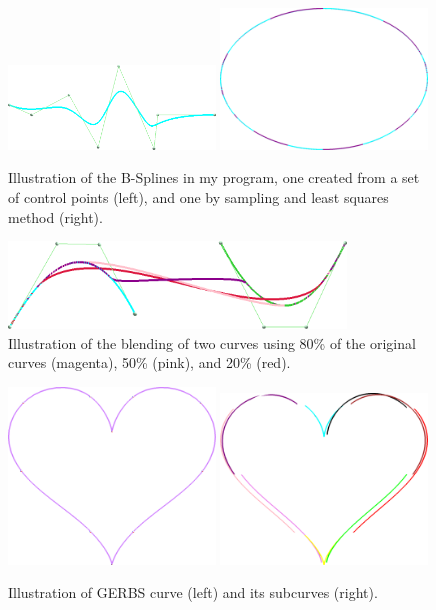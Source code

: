 \documentclass[a4paper,12pt]{extarticle}
\begin{document}
\begin{figure}[H]
  \centering
  \includegraphics[width=0.49\textwidth]{B-Spline.png}
  \includegraphics[width=0.49\textwidth]{Sampling.png}
  \caption{Illustration of the B-Splines in my program, one created from a set of control points (left), and one by sampling and least squares method (right).}
  \label{fig:B-Splines}
\end{figure}

\begin{figure}[H]
  \centering
  \includegraphics[width=0.8\textwidth]{Blending.png}
  \caption{Illustration of the blending of two curves using 80\% of the original curves (magenta), 50\% (pink), and 20\% (red).}
  \label{fig:Blending}
\end{figure}

\begin{figure}[H]
  \centering
  \includegraphics[width=0.49\textwidth]{GERBSCurve.png}
  \includegraphics[width=0.49\textwidth]{LocalCurves.png}
  \caption{Illustration of GERBS curve (left) and its subcurves (right).}
  \label{fig:GERBSCurve}
\end{figure}
\end{document}

